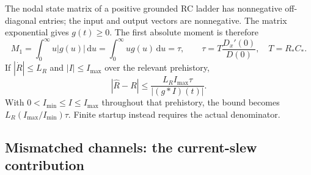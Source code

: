 The nodal state matrix of a positive grounded RC ladder has nonnegative off-diagonal entries; the input and output vectors are nonnegative. The matrix exponential gives $g(t)\ge0$. The first absolute moment is therefore
\begin{equation}\label{eq:dynamic-moment}
M_1=\int_0^\infty u|g(u)|\,\mathrm du
=\int_0^\infty ug(u)\,\mathrm du=\tau,
\qquad \tau=T\frac{D_x'(0)}{D(0)},\quad T=R_*C_*.
\end{equation}
If $|\dot R|\le L_R$ and $|I|\le I_{\max}$ over the relevant prehistory,
\begin{equation}\label{eq:lag-bound}
|\hat R-R|\le\frac{L_R I_{\max}\tau}{|(g\ast I)(t)|}.
\end{equation}
With $0<I_{\min}\le I\le I_{\max}$ throughout that prehistory, the bound becomes $L_R(I_{\max}/I_{\min})\tau$. Finite startup instead requires the actual denominator.

\subsection{Mismatched channels: the current-slew contribution}
\label{sec:dynamic-mismatch}

